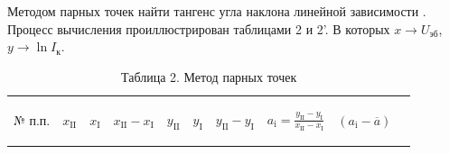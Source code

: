 Методом парных точек найти тангенс угла наклона линейной
зависимости . Процесс вычисления проиллюстрирован таблицами 2 и 2'. В которых $x \rightarrow{} U_{\text{эб}}$, $y\rightarrow{} \ln I_{\text{к}}$.
\begin{center}
\begin{table}[H]
\centering
\caption*{Таблица 2. Метод парных точек}
\label{tabl:2}
\begin{tabular}{|c|c|c|c|c|c|c|c|c|c|}
\hline
\begin{minipage}{7mm}
    № п.п. 
\end{minipage}&
\begin{minipage}{7mm}
   \begin{center} $x_{\text{II}}$ \end{center} 
\end{minipage} &
\begin{minipage}{7mm}
   \begin{center} $x_{\text{I}}$ \end{center} 
\end{minipage} &
\begin{minipage}{14mm}
   \begin{center} $x_{\text{II}}-x_{\text{I}}$ \end{center} 
\end{minipage}&
\begin{minipage}{7mm}
   \begin{center} $y_{\text{II}}$ \end{center} 
\end{minipage}&
\begin{minipage}{7mm}
   \begin{center} $y_{\text{I}}$ \end{center} 
\end{minipage}&
\begin{minipage}{14mm}
   \begin{center} $y_{\text{II}}-y_{\text{I}}$ \end{center} 
\end{minipage}&
\begin{minipage}{25mm}
   \begin{center} $a_{\text{i}}=\frac{y_{\text{II}}-y_{\text{I}}}{x_{\text{II}}-x_{\text{I}}}$ \end{center} 
\end{minipage}&
\begin{minipage}{21mm}
     \begin{center} $(a_{\text{i}}-\overline{a})$ \end{center}

\end{minipage}
\end{tabular}
\end{table}
\end{center}
